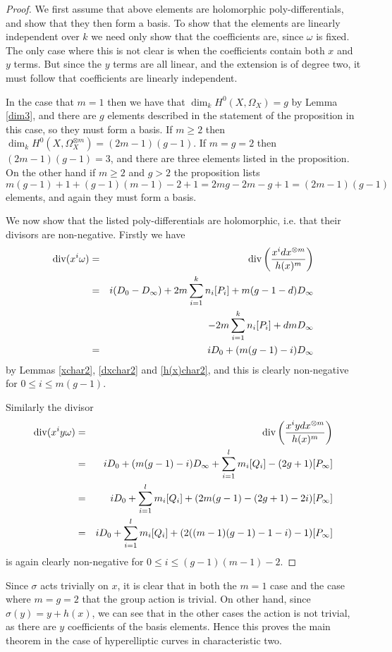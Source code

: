 \begin{proof}
 We first assume that above elements are holomorphic poly-differentials, and show that they then form a basis.
To show that the elements are linearly independent over $k$ we need only show that the coefficients are, since $\omega$ is fixed.
The only case where this is not clear is when the coefficients contain both $x$ and $y$ terms.
But since the $y$ terms are all linear, and the extension is of degree two, it must follow that coefficients are linearly independent.
 
 
 In the case that $m=1$ then we have that $\dim_k H^0(X,\Omega_X) =g$ by Lemma \ref{dim3}, and there are $g$ elements described in the statement of the proposition in this case, so they must form a basis.
 If $m \geq 2$ then $\dim_k H^0(X,\Omega_X^{\otimes m}) = (2m-1)(g-1)$.
 If $m=g=2$ then $(2m-1)(g-1) = 3$, and there are three elements listed in the proposition.
 On the other hand if $m\geq 2$ and $g > 2$ the proposition lists
 \[
  m(g-1)+1 + (g-1)(m-1)-2+1 = 2mg -2m -g +1 = (2m-1)(g-1)
 \]
 elements, and again they must form a basis.
 
 We now show that the listed poly-differentials are holomorphic, i.e. that their divisors are non-negative.
 Firstly we have
 \begin{eqnarray*}
  \operatorname{div}(x^i\omega) & = & \operatorname{div} \left( \frac{x^i dx^{\otimes m}}{h(x)^m} \right)\\ & = & i(D_0 - D_\infty) +2m\sum_{i=1}^k n_i[P_i] + m(g-1-d)D_\infty\\
  & & -2m\sum_{i=1}^k n_i [P_i] + dmD_\infty \\
  & = & iD_0 + (m(g-1) -i)D_\infty
 \end{eqnarray*}
  by Lemmas \ref{xchar2}, \ref{dxchar2} and \ref{h(x)char2}, and this is clearly non-negative for $0\leq i \leq m(g-1)$.
  
  Similarly the divisor 
  \begin{eqnarray*}
   \operatorname{div}(x^iy\omega) & = & \operatorname{div} \left( \frac{x^i ydx^{\otimes m}}{h(x)^m} \right)\\ & = & iD_0 + (m(g-1) -i)D_\infty + \sum_{i=1}^l m_i[Q_i] - (2g+1)[P_\infty] \\
    & = & iD_0 +  \sum_{i=1}^l m_i[Q_i] + (2m(g-1) -(2g+1) -2i)[P_\infty] \\
   & = & iD_0 +  \sum_{i=1}^l m_i[Q_i] + (2((m-1)(g-1) -1 -i)-1)[P_\infty]
  \end{eqnarray*}
 is again clearly non-negative for $0 \leq i \leq (g-1)(m-1)-2$.

  \end{proof}

  Since $\sigma$ acts trivially on $x$, it is clear that in both the $m=1$ case and the case where $m=g=2$ that the group action is trivial.
  On other hand, since $\sigma(y) = y+h(x)$, we can see that in the other cases the action is not trivial, as there are $y$ coefficients of the basis elements.
  Hence this proves the main theorem in the case of hyperelliptic curves in characteristic two.
  
  

